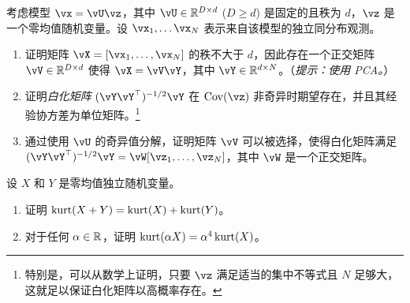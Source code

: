\documentclass[../../book-main_zh.tex]{subfiles}
\begin{document}
\begin{exercise}\label{exercise:whitening}
    考虑模型 $\vx = \vU \vz$，其中 $\vU \in \R^{D \times d}$ ($D \geq d$) 是固定的且秩为 $d$，$\vz$ 是一个零均值随机变量。设 $\vx_1, \dots \vx_N$ 表示来自该模型的独立同分布观测。
    \begin{enumerate}
        \item 证明矩阵 $\vX = [\vx_1, \dots, \vx_N]$ 的秩不大于 $d$，因此存在一个正交矩阵 $\vV \in \R^{D \times d}$ 使得 $\vX = \vV \vY$，其中 $\vY \in \R^{d \times N}$。（\textit{提示：使用 PCA。}）
        \item 证明\textit{白化矩阵} $(\vY \vY^\top)^{-1/2}\vY$ 在 $\Cov(\vz)$ 非奇异时期望存在，并且其经验协方差为单位矩阵。\footnote{特别是，可以从数学上证明，只要 $\vz$ 满足适当的集中不等式且 $N$ 足够大，这就足以保证白化矩阵以高概率存在。}
        \item 通过使用 $\vU$ 的奇异值分解，证明矩阵 $\vV$ 可以被选择，使得白化矩阵满足 $(\vY \vY^\top)^{-1/2} \vY = \vW [\vz_1, \dots, \vz_N]$，其中 $\vW$ 是一个正交矩阵。
    \end{enumerate}
\end{exercise}

\begin{exercise}\label{exercise:kurtosis-linearity-properties}
    设 $X$ 和 $Y$ 是零均值独立随机变量。
    \begin{enumerate}
        \item 证明 $\mathop{\mathrm{kurt}}(X + Y) = \mathop{\mathrm{kurt}}(X) + \mathop{\mathrm{kurt}}(Y)$。
        \item 对于任何 $\alpha \in \mathbb{R}$，证明 $\mathop{\mathrm{kurt}}(\alpha X) = \alpha^4 \mathop{\mathrm{kurt}}(X)$。
    \end{enumerate}
\end{exercise}
\end{document}
